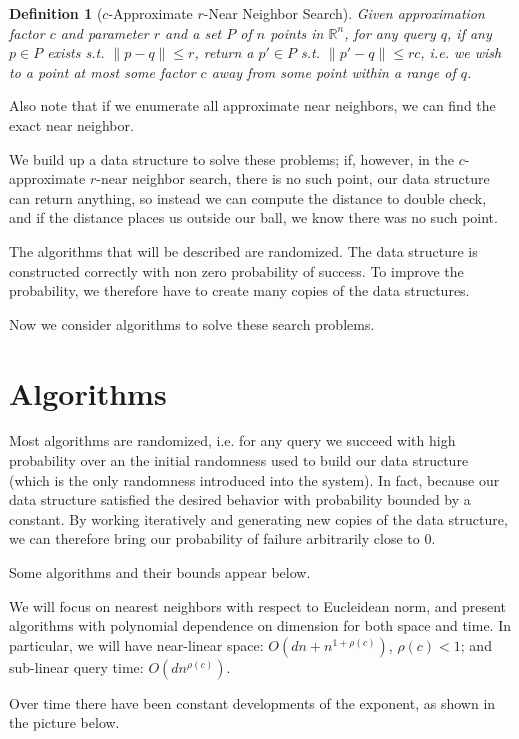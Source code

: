 \documentclass[11pt]{article}
\newtheorem{definition}[theorem]{Definition}
\begin{document}
\begin{definition}[$c$-Approximate $r$-Near Neighbor Search]
    Given approximation factor $c$ and parameter $r$ and a set $P$ of $n$ points in $\mathbb{R}^n$, for any query $q$, if any $p \in P$ exists s.t. $\| p-q \| \leq r$, return a $p' \in P$ s.t. $\| p'-q \| \leq rc$, i.e. we wish to a point at most some factor $c$ away from some point within a range of $q$.
\end{definition}

Also note that if we enumerate all approximate near neighbors, we can find the exact near neighbor.

We build up a data structure to solve these problems; if, however, in the $c$-approximate $r$-near neighbor search, there is no such point, our data structure can return anything, so instead we can compute the distance to double check, and if the distance places us outside our ball, we know there was no such point.


The algorithms that will be described are randomized. The data structure is constructed correctly with non zero probability of success. To improve the probability, we therefore have to create many copies of the data structures.

Now we consider algorithms to solve these search problems.


\section{Algorithms}

Most algorithms are randomized, i.e. for any query we succeed with high probability over an the initial randomness used to build our data structure (which is the only randomness introduced into the system). In fact, because our data structure satisfied the desired behavior with probability bounded by a constant. By working iteratively and generating new copies of the data structure, we can therefore bring our probability of failure arbitrarily close to 0.

Some algorithms and their bounds appear below.

We will focus on nearest neighbors with respect to Eucleidean norm, and present algorithms with polynomial dependence on dimension for both space and time. In particular, we will have near-linear space: $O(dn+n^{1+\rho(c)})$, $\rho(c) < 1$; and sub-linear query time: $O(dn^{\rho(c)})$.

Over time there have been constant developments of the exponent, as shown in the picture below. 
\end{document}

